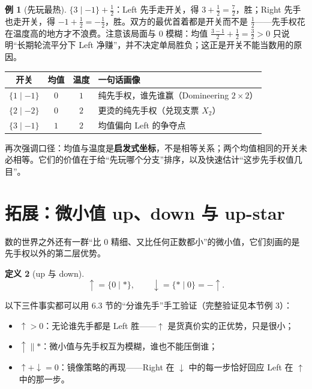 \documentclass[UTF8,a4paper,11pt,oneside,openany,fontset=fandol]{ctexbook}
\theoremstyle{definition}
\newtheorem{definition}{定义}[chapter]
\newtheorem{example}[definition]{例}
\begin{document}
\begin{example}[先玩最热]\label{ex:hotstrat}
$\{3\mid -1\}+\tfrac12$：Left 先手走开关，得 $3+\tfrac12=\tfrac72$，胜；Right 先手也走开关，得 $-1+\tfrac12=-\tfrac12$，胜。双方的最优首着都是开关而不是 $\tfrac12$——先手权花在温度高的地方才不浪费。注意该局面与 $0$ 模糊：均值 $\tfrac{3-1}{2}+ \tfrac12=\tfrac32>0$ 只说明“长期轮流平分下 Left 净赚”，并不决定单局胜负；这正是开关不能当数用的原因。
\end{example}

\begin{center}
\begin{tabular}{cccl}
\toprule
开关 & 均值 & 温度 & 一句话画像\\
\midrule
$\{1\mid -1\}$ & $0$ & $1$ & 纯先手权，谁先谁赢（Domineering $2\times2$）\\
$\{2\mid -2\}$ & $0$ & $2$ & 更烫的纯先手权（兑现支票 $X_2$）\\
$\{3\mid -1\}$ & $1$ & $2$ & 均值偏向 Left 的争夺点\\
\bottomrule
\end{tabular}
\end{center}

再次强调口径：均值与温度是\textbf{启发式坐标}，不是相等关系；两个均值相同的开关未必相等。它们的价值在于给“先玩哪个分支”排序，以及快速估计“这步先手权值几目”。

\section{拓展：微小值 up、down 与 up-star}
数的世界之外还有一群“比 $0$ 精细、又比任何正数都小”的微小值，它们刻画的是先手权以外的第二层优势。

\begin{definition}[up 与 down]
\[
 \uparrow=\{0\mid \ast\},\qquad \downarrow=\{\ast\mid 0\}=-\uparrow .
\]
\end{definition}

以下三件事实都可以用 6.3 节的“分谁先手”手工验证（完整验证见本节例 3）：
\begin{itemize}
\item $\uparrow>0$：无论谁先手都是 Left 胜——$\uparrow$ 是货真价实的正优势，只是很小；
\item $\uparrow\parallel\ast$：微小值与先手权互为模糊，谁也不能压倒谁；
\item $\uparrow+\downarrow=0$：镜像策略的再现——Right 在 $\downarrow$ 中的每一步恰好回应 Left 在 $\uparrow$ 中的那一步。
\end{itemize}
\end{document}
